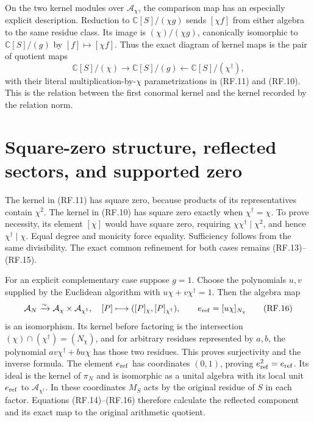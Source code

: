 \documentclass[11pt]{article}
\newcommand{\C}{\mathbb C}
\newcommand{\A}{\mathcal A}
\begin{document}
On the two kernel modules over $\A_\chi$, the comparison map has
an especially explicit description. Reduction to $\C[S]/(\chi g)$
sends $[\chi f]$ from either algebra to the same residue class.
Its image is $(\chi)/(\chi g)$, canonically isomorphic to
$\C[S]/(g)$ by $[f]\mapsto[\chi f]$. Thus the exact diagram of
kernel maps is the pair of quotient maps
\[
 \C[S]/(\chi)\longrightarrow\C[S]/(g)
 \longleftarrow\C[S]/(\chi^\dagger),
 \tag{RF.15}
\]
with their literal multiplication-by-$\chi$ parametrizations in
(RF.11) and (RF.10). This is the relation between the first
conormal kernel and the kernel recorded by the relation norm.

\section{Square-zero structure, reflected sectors, and supported zero}

The kernel in (RF.11) has square zero, because products of its
representatives contain $\chi^2$. The kernel in (RF.10) has square
zero exactly when $\chi^\dagger=\chi$. To prove necessity, its
element $[\chi]$ would have square zero, requiring
$\chi\chi^\dagger\mid\chi^2$, and hence
$\chi^\dagger\mid\chi$. Equal degree and monicity force equality.
Sufficiency follows from the same divisibility. The exact common
refinement for both cases remains (RF.13)--(RF.15).

For an explicit complementary case suppose $g=1$. Choose the
polynomials $u,v$ supplied by the Euclidean algorithm with
$u\chi+v\chi^\dagger=1$. Then the algebra map
\[
 \A_N\xrightarrow{\sim}\A_\chi\times\A_{\chi^\dagger},
 \quad[P]\longmapsto([P]_{\chi},[P]_{\chi^\dagger}),
 \qquad e_{\rm ref}=[u\chi]_{N_\chi}
 \tag{RF.16}
\]
is an isomorphism. Its kernel before factoring is the intersection
$(\chi)\cap(\chi^\dagger)=(N_\chi)$, and for arbitrary residues
represented by $a,b$, the polynomial
$a v\chi^\dagger+b u\chi$ has those two residues. This proves
surjectivity and the inverse formula. The element $e_{\rm ref}$
has coordinates $(0,1)$, proving $e_{\rm ref}^2=e_{\rm ref}$.
Its ideal is the kernel of $\pi_N$ and is isomorphic as a unital
algebra with its local unit $e_{\rm ref}$ to
$\A_{\chi^\dagger}$. In these coordinates $M_S$ acts by the
original residue of $S$ in each factor. Equations (RF.14)--(RF.16)
therefore calculate the reflected component and its exact map to
the original arithmetic quotient.
\end{document}
